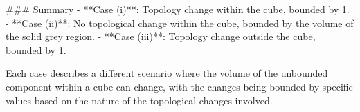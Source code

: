 ### Summary
- **Case (i)**: Topology change within the cube, bounded by 1.
- **Case (ii)**: No topological change within the cube, bounded by the volume of the solid grey region.
- **Case (iii)**: Topology change outside the cube, bounded by 1.

Each case describes a different scenario where the volume of the unbounded component within a cube can change, with the changes being bounded by specific values based on the nature of the topological changes involved.